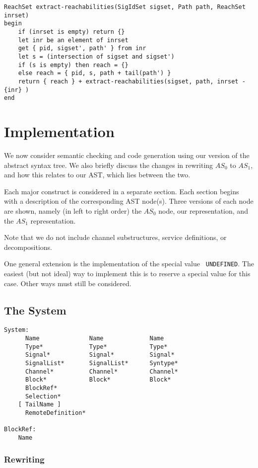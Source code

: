 \begin{verbatim}
ReachSet extract-reachabilities(SigIdSet sigset, Path path, ReachSet inrset)
begin
    if (inrset is empty) return {}
    let inr be an element of inrset
    get { pid, sigset', path' } from inr
    let s = (intersection of sigset and sigset')
    if (s is empty) then reach = {}
    else reach = { pid, s, path + tail(path') }
    return { reach } + extract-reachabilities(sigset, path, inrset - {inr} )
end
\end{verbatim}

\section{Implementation}

We now consider semantic checking and code generation
using our version of the abstract syntax tree.
We also briefly discuss the changes in rewriting $AS_0$ to $AS_1$,
and how this relates to our AST, which lies between the two.

Each major construct is considered in a separate section. Each
section begins with a description of the corresponding AST node(s).
Three versions of each node are shown, namely (in left to right
order) the $AS_0$ node, our representation, and the $AS_1$
representation.

Note that we do not include channel substructures, service
definitions, or decompositions.

One general extension is the implementation of the special value {\tt
UNDEFINED}. The easiest (but not ideal) way to implement this is to
reserve a special value for this case. Other ways must still be
considered.

\subsection{The System}

\begin{verbatim}
System:
      Name              Name             Name
      Type*             Type*            Type*
      Signal*           Signal*          Signal*
      SignalList*       SignalList*      Syntype*
      Channel*          Channel*         Channel*
      Block*            Block*           Block*
      BlockRef*
      Selection*
    [ TailName ]
      RemoteDefinition*

BlockRef:
    Name
\end{verbatim}

\subsubsection{Rewriting}

